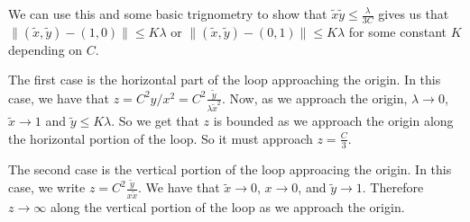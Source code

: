 \begin{enumerate}
We can use this and some basic trignometry to show that \(\tilde x \tilde y \leq \frac{\lambda}{3C}\) gives us that \(\|(\tilde x, \tilde y) - (1,0)\| \leq K \lambda\) or
\(\|(\tilde x, \tilde y) - (0, 1)\| \leq K \lambda\) for some constant \(K\) depending on \(C\).

The first case is the horizontal part of the loop approaching the origin. In this case, we have that \(z = C^2 y / x^2 = C^2 \frac{\tilde y} {\lambda \tilde x^2}\). Now, as we approach
the origin, \(\lambda \to 0\), \(\tilde x \to 1\) and \(\tilde y \leq K \lambda\). So we get that \(z\) is bounded as we approach the origin along the horizontal portion of the loop.
So it must approach \(z = \frac{C}{3}\).

The second case is the vertical portion of the loop approacing the origin. In this case, we write \(z = C^2 \frac{\tilde y}{x\tilde x}\). We have that \(\tilde x \to 0\), \(x \to 0\), and
\(\tilde y \to 1\). Therefore \(z \to \infty\) along the vertical portion of the loop as we approach the origin.


\end{enumerate}
